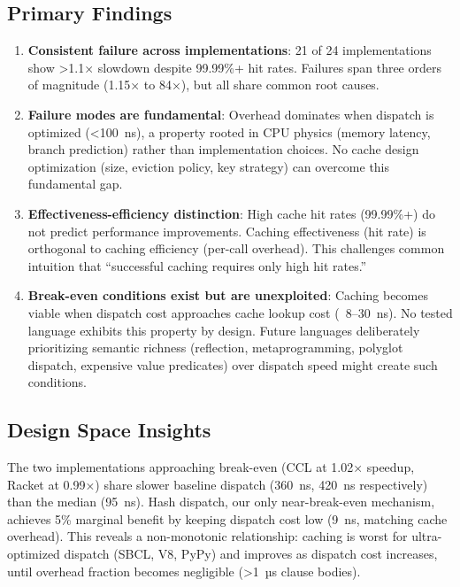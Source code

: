 \documentclass[sigplan,final,acmsmall,review,screen]{acmart}
\begin{document}
\subsection{Primary Findings}

\begin{enumerate}
  \item \textbf{Consistent failure across implementations}: 21 of 24 implementations show >1.1× slowdown despite 99.99\%+ hit rates.
    Failures span three orders of magnitude (1.15× to 84×), but all share common root causes.

  \item \textbf{Failure modes are fundamental}: Overhead dominates when dispatch is optimized (<100~ns), a property
    rooted in CPU physics (memory latency, branch prediction) rather than implementation choices. No cache design optimization
    (size, eviction policy, key strategy) can overcome this fundamental gap.

  \item \textbf{Effectiveness-efficiency distinction}: High cache hit rates (99.99\%+) do not predict performance improvements.
    Caching effectiveness (hit rate) is orthogonal to caching efficiency (per-call overhead). This challenges common intuition
    that ``successful caching requires only high hit rates.''

  \item \textbf{Break-even conditions exist but are unexploited}: Caching becomes viable when dispatch cost approaches cache lookup cost
    (~8--30~ns). No tested language exhibits this property by design. Future languages deliberately prioritizing semantic richness
    (reflection, metaprogramming, polyglot dispatch, expensive value predicates) over dispatch speed might create such conditions.
\end{enumerate}

\subsection{Design Space Insights}

The two implementations approaching break-even (CCL at 1.02× speedup, Racket at 0.99×) share slower baseline dispatch (360~ns, 420~ns
respectively) than the median (95~ns). Hash dispatch, our only near-break-even mechanism, achieves 5\% marginal benefit by keeping dispatch cost
low (9~ns, matching cache overhead). This reveals a non-monotonic relationship: caching is worst for ultra-optimized dispatch
(SBCL, V8, PyPy) and improves as dispatch cost increases, until overhead fraction becomes negligible (>1~µs clause bodies).
\end{document}
